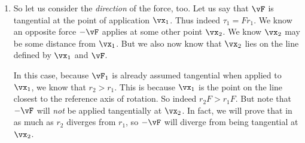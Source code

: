 \begin{enumerate}
  \item So let us consider the \emph{direction} of the force, too. Let
  us say that $\vF$ is tangential at the point of application $\vx_1$.
  Thus indeed $\tau_1 = F r_1$. We know an opposite force $-\vF$ applies
  at some other point $\vx_2$. We know $\vx_2$ may be some distance from
  $\vx_1$. But we also now know that $\vx_2$ lies on the line defined by
  $\vx_1$ and $\vF$.

  In this case, because $\vF_1$ is already assumed tangential when
  applied to $\vx_1$, we know that $r_2 > r_1$. This is because $\vx_1$
  is the point on the line closest to the reference axis of rotation. So
  indeed $r_2 F > r_1 F$. But note that $-\vF$ will \emph{not} be
  applied tangentially at $\vx_2$. In fact, we will prove that in as
  much as $r_2$ diverges from $r_1$, so $-\vF$ will diverge from
  being tangential at $\vx_2$.
\end{enumerate}
